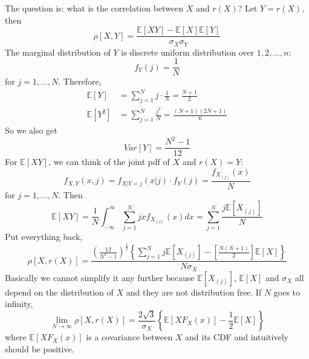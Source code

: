 \documentclass[twoside]{article}
\begin{document}
The question is: what is the correlation between $X$ and $r(X)$? Let $Y = r(X)$, then
$$
\rho \left[ X, Y \right] = \frac{\mathbb{E} [XY] - \mathbb{E} [X] \mathbb{E} [Y]}{\sigma_X \sigma_Y}
$$
The marginal distribution of $Y$ is  discrete uniform distribution over ${1, 2, \dots, n}$: 
$$
f_Y(j) = \frac{1}{N}
$$
for $j = 1, ..., N$. Therefore, 
\begin{align*}
	\mathbb{E} \left[ Y \right] &= \sum_{j=1}^N j \cdot \frac{1}{N} = \frac{N+1}{2} \\
	\mathbb{E} \left[ Y^2 \right] &= \sum_{j=1}^N \frac{j^2}{N} = \frac{(N+1)(2N+1)}{6}
\end{align*}
So we also get
$$
Var \left[ Y \right] = \frac{N^2 - 1}{12}
$$
For $\mathbb{E} \left[ XY \right]$, we can think of the joint pdf of $X$ and $r(X) = Y$: 
$$
f_{X,Y} (x, j) = f_{X | Y = j} (x|j) \cdot f_{Y} (j) = \frac{f_{X_{(j)}} (x)}{N}
$$
for $j = 1,...,N$. Then
$$
\mathbb{E} \left[ XY \right] = \frac{1}{N} \int_{- \infty}^{\infty} \sum_{j=1}^N j x f_{X_{(j)}}(x) dx = \sum_{j=1}^{N} \frac{j \mathbb{E} \left[ X_{(j)} \right]}{N}
$$
Put everything back, 
$$
\rho \left[ X, r(X) \right] = \frac{\left( \frac{12}{N^2 - 1} \right)^{\frac{1}{2}} \left\{\sum_{j=1}^{N} j \mathbb{E} \left[ X_{(j)} \right] - \left[ \frac{N(N+1)}{2} \right] \mathbb{E} \left[ X \right] \right\}}{N \sigma_X}
$$
Basically we cannot simplify it any further because $\mathbb{E} \left[ X_{(j)} \right]$, $\mathbb{E} \left[ X \right]$ and $\sigma_X$ all depend on the distribution of $X$ and they are not distribution free. If $N$ goes to infinity, 
$$
\lim_{N \to \infty} \rho \left[ X, r(X) \right] = \frac{2 \sqrt{3}}{\sigma_X} \left\{ \mathbb{E} \left[ X F_X(x) \right] - \frac{1}{2} \mathbb{E} \left[ X \right] \right\}
$$
where $\mathbb{E}[X F_X(x)]$ is a covariance between $X$ and its CDF and intuitively should be positive. 
\end{document}
